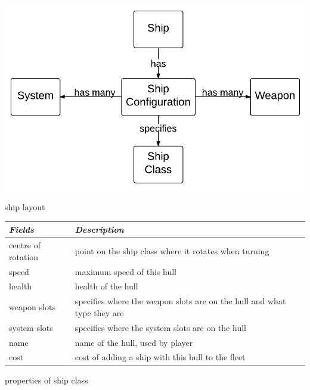 \begin{marginfigure}
	\includegraphics{res/model/ship.pdf}
	\caption{ship layout}
	\label{fig:model:shipRelation}
\end{marginfigure}

\begin{margintable}
    \begin{tabular}{p{4em} p{11em}}
    \toprule
    \emph{Fields} & \emph{Description} \\
    \midrule
    centre of rotation & point on the ship class where it rotates when turning \\
    speed & maximum speed of this hull \\
    health & health of the hull \\
    weapon slots & specifies where the weapon slots are on the hull and what type they are \\
    system slots & specifies where the system slots are on the hull \\
    name & name of the hull, used by player \\
    cost & cost of adding a ship with this hull to the fleet \\
    \bottomrule
    \end{tabular}
    	\vspace{1em}
	\caption{properties of ship class}
	\label{tab:model:shipClassFields}
\end{margintable}







